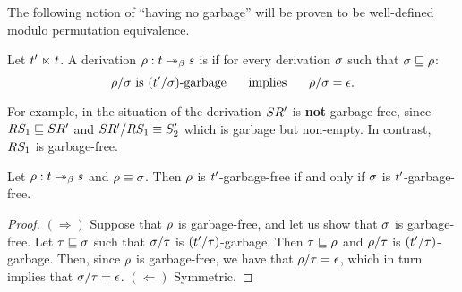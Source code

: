 The following notion of ``having no garbage'' will be proven to be well-defined
modulo permutation equivalence.

\begin{definition}
Let $t' \mathrel{\ltimes} t$.
A derivation $\rho : t \mathrel{\twoheadrightarrow_\beta} s$ is 
if
for every derivation $\sigma$ such that $\sigma \sqsubseteq \rho$:
\[
  \rho/\sigma \text{ is $(t'/\sigma)$-garbage}
  \hspace{.5cm}\text{ implies }\hspace{.5cm}
  \rho/\sigma = \epsilon.
\]
\end{definition}

For example, in the situation of 
the derivation $SR'$ is {\bf not} garbage-free,
since $RS_1 \sqsubseteq SR'$
and $SR'/RS_1 \equiv S'_2$
which is garbage but non-empty.
In contrast, $RS_1$ is garbage-free.


\begin{lemma}
Let $\rho : t \mathrel{\twoheadrightarrow_\beta} s$ and $\rho \equiv \sigma$.
Then $\rho$ is $t'$-garbage-free
if and only if $\sigma$ is $t'$-garbage-free.
\end{lemma}
\begin{proof}
$(\Rightarrow)$
Suppose that $\rho$ is garbage-free, and let us show that $\sigma$ is garbage-free.
Let $\tau \sqsubseteq \sigma$ such that $\sigma/\tau$ is $(t'/\tau)$-garbage.
Then $\tau \sqsubseteq \rho$ and $\rho/\tau$ is $(t'/\tau)$-garbage. 
Then, since $\rho$ is garbage-free,
we have that $\rho/\tau = \epsilon$,
which in turn implies that $\sigma/\tau = \epsilon$.
$(\Leftarrow)$ Symmetric.
\end{proof}

